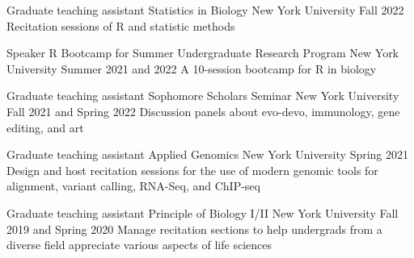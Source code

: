 \setlength{\footskip}{15pt}

\begin{cventries}
  \cventry
    {Graduate teaching assistant} %
    {Statistics in Biology} %
    {New York University} %
    {Fall 2022} %
    {Recitation sessions of R and statistic methods}
    
  \cventry
    {Speaker} %
    {R Bootcamp for Summer Undergraduate Research Program} %
    {New York University} %
    {Summer 2021 and 2022} %
    {A 10-session bootcamp for R in biology}

  \cventry
    {Graduate teaching assistant} %
    {Sophomore Scholars Seminar} %
    {New York University} %
    {Fall 2021 and Spring 2022} %
    {Discussion panels about evo-devo, immunology, gene editing, and art}
    
  \cventry
    {Graduate teaching assistant} %
    {Applied Genomics} %
    {New York University} %
    {Spring 2021} %
    {Design and host recitation sessions for the use of modern genomic tools for alignment, variant calling, RNA-Seq, and ChIP-seq}

  \cventry
    {Graduate teaching assistant} %
    {Principle of Biology I/II} %
    {New York University} %
    {Fall 2019 and Spring 2020} %
    {Manage recitation sections to help undergrads from a diverse field appreciate various aspects of life sciences}

\end{cventries}
